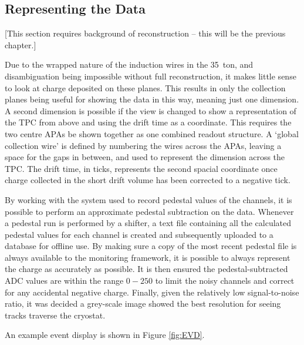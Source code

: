 \subsection{Representing the Data}\label{RepresentingEVDData}

[This section requires background of reconstruction -- this will be the previous chapter.]

Due to the wrapped nature of the induction wires in the 35~ton, and disambiguation being impossible without full reconstruction, it makes little sense to look at charge deposited on these planes.  This results in only the collection planes being useful for showing the data in this way, meaning just one dimension.  A second dimension is possible if the view is changed to show a representation of the TPC from above and using the drift time as a coordinate.  This requires the two centre APAs be shown together as one combined readout structure.  A `global collection wire' is defined by numbering the wires across the APAs, leaving a space for the gaps in between, and used to represent the dimension across the TPC.  The drift time, in ticks, represents the second spacial coordinate once charge collected in the short drift volume has been corrected to a negative tick.

By working with the system used to record pedestal values of the channels, it is possible to perform an approximate pedestal subtraction on the data.  Whenever a pedestal run is performed by a shifter, a text file containing all the calculated pedestal values for each channel is created and subsequently uploaded to a database for offline use.  By making sure a copy of the most recent pedestal file is always available to the monitoring framework, it is possible to always represent the charge as accurately as possible.  It is then ensured the pedestal-subtracted ADC values are within the range $0-250$ to limit the noisy channels and correct for any accidental negative charge.  Finally, given the relatively low signal-to-noise ratio, it was decided a grey-scale image showed the best resolution for seeing tracks traverse the cryostat.

An example event display is shown in Figure \ref{fig:EVD}.

